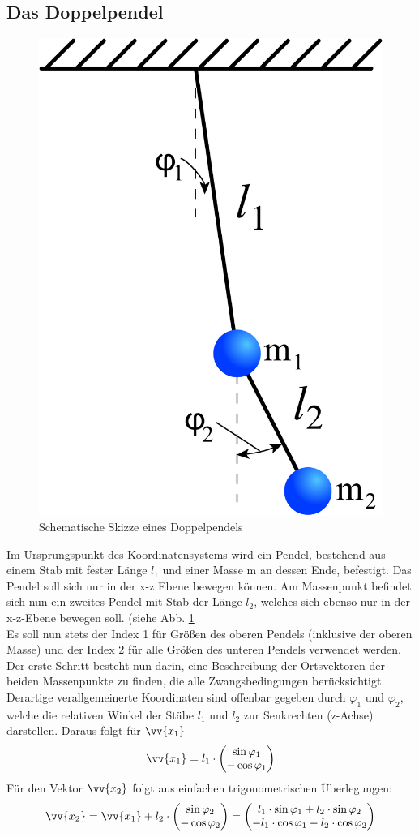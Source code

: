 \subsection{Das Doppelpendel}
\begin{figure}
	\centering
	\includegraphics[width=.3\textwidth]{images/double-pendulum.png}
	\caption{Schematische Skizze eines Doppelpendels}
	\label{wiki:double-pendulum}
\end{figure}
Im Ursprungspunkt des Koordinatensystems wird ein Pendel, bestehend aus einem Stab mit fester Länge $l_1$ und einer Masse m an dessen Ende, befestigt. Das Pendel soll sich nur in der x-z Ebene bewegen können. Am Massenpunkt befindet sich nun ein zweites Pendel mit Stab der Länge $l_2$, welches sich ebenso nur in der x-z-Ebene bewegen soll. (siehe Abb. \ref{wiki:double-pendulum} \\Es soll nun stets der Index 1 für Größen des oberen Pendels (inklusive der oberen Masse) und der Index 2 für alle Größen des unteren Pendels verwendet werden. \\
Der erste Schritt besteht nun darin, eine Beschreibung der Ortsvektoren der beiden Massenpunkte zu finden, die alle Zwangsbedingungen berücksichtigt. 
Derartige verallgemeinerte Koordinaten sind offenbar gegeben durch $ \varphi_1 $ und $ \varphi_2 $, welche die relativen Winkel der Stäbe $l_1 $ und $l_2$ zur Senkrechten (z-Achse) darstellen. Daraus folgt für $ \vv{x_1} $
\begin{equation}
\vv{x_1}= l_1\cdot\begin{pmatrix}
\sin \varphi_1 \\ -\cos \varphi_1
\end{pmatrix}
\end{equation}
Für den Vektor $\vv{x_2}$ folgt aus einfachen trigonometrischen Überlegungen:
\begin{equation}
\vv{x_2}= \vv{x_1} + l_2 \cdot \begin{pmatrix}
\sin \varphi_2 \\ -\cos \varphi_2
\end{pmatrix}
= \begin{pmatrix}
l_1 \cdot \sin \varphi_1 + l_2 \cdot \sin \varphi_2 \\ - l_1 \cdot \cos \varphi_1 - l_2 \cdot \cos \varphi_2
\end{pmatrix}
\end{equation}
